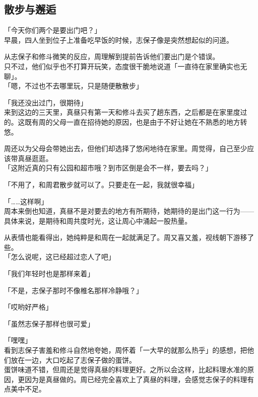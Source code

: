 \subsection{散步与邂逅}

「今天你们两个是要出门吧？」\\

早晨，四人坐到位子上准备吃早饭的时候，志保子像是突然想起似的问道。

从志保子和修斗微笑的反应，周理解到提前告诉他们要出门是个错误。\\

只不过，他们似乎也不打算开玩笑，态度很干脆地说道「一直待在家里确实也无聊」。\\

「嗯，不过也不去哪里玩，只是随便散散步」

「我还没出过门，很期待」\\

来到这边的三天里，真昼只有第一天和修斗去买了趟东西，之后都是在家里度过的。这既有周的父母一直在招待她的原因，也是由于不好让她在不熟悉的地方转悠。

周还以为父母会带她出去，但他们却选择了悠闲地待在家里。周觉得，自己至少应该带真昼逛逛。\\

「这附近真的只有公园和超市哦？到市区倒是会不一样，要去吗？」

「不用了，和周君散步就可以了。只要走在一起，我就很幸福」

「……这样啊」\\

周本来倒也知道，真昼不是对要去的地方有所期待，她期待的是出门这一行为——具体来说，是期待和周共度时光，这让周心中涌起一股热量。

从表情也能看得出，她纯粹是和周在一起就满足了。周又喜又羞，视线朝下游移了些。\\

「怎么说呢，这已经超过恋人了吧」

「我们年轻时也是那样来着」

「不是，志保子那时不像椎名那样冷静哦？」

「哎哟好严格」

「虽然志保子那样也很可爱」

「嘿嘿」\\

看到志保子害羞和修斗自然地夸她，周怀着「一大早的就那么热乎」的感想，把他们放在一边，大口吃起了志保子做的蛋饼。\\

蛋饼味道不错，但周还是觉得真昼的料理更好。之所以会这样，比起料理水准的原因，更因为是真昼做的。周已经完全喜欢上了真昼的料理，会感觉志保子的料理有点美中不足。\\

